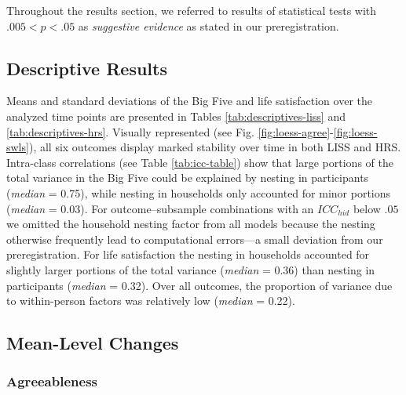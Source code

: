\documentclass[
  english,
  man, noextraspace]{apa7}
\begin{document}
Throughout the results section, we referred to results of statistical tests with \(.005 < p < .05\) as \emph{suggestive evidence} as stated in our preregistration.

\hypertarget{descriptive-results}{%
\subsection{Descriptive Results}\label{descriptive-results}}

Means and standard deviations of the Big Five and life satisfaction over the analyzed time points are presented in Tables \ref{tab:descriptives-liss} and \ref{tab:descriptives-hrs}. Visually represented (see Fig. \ref{fig:loess-agree}-\ref{fig:loess-swls}), all six outcomes display marked stability over time in both LISS and HRS. Intra-class correlations (see Table \ref{tab:icc-table}) show that large portions of the total variance in the Big Five could be explained by nesting in participants (\emph{median} = 0.75), while nesting in households only accounted for minor portions (\emph{median} = 0.03). For outcome--subsample combinations with an \(ICC_{hid}\) below \(.05\) we omitted the household nesting factor from all models because the nesting otherwise frequently lead to computational errors---a small deviation from our preregistration. For life satisfaction the nesting in households accounted for slightly larger portions of the total variance (\emph{median} = 0.36) than nesting in participants (\emph{median} = 0.32). Over all outcomes, the proportion of variance due to within-person factors was relatively low (\emph{median} = 0.22).

\hypertarget{mean-level-changes}{%
\subsection{Mean-Level Changes}\label{mean-level-changes}}

\hypertarget{agreeableness}{%
\subsubsection{Agreeableness}\label{agreeableness}}
\end{document}
